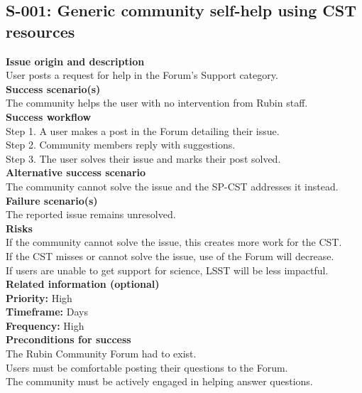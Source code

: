 \subsection{S-001: Generic community self-help using CST resources}

\textbf{Issue origin and description} \\
User posts a request for help in the Forum's Support category. \\

\textbf{Success scenario(s)} \\
The community helps the user with no intervention from Rubin staff. \\

\textbf{Success workflow} \\
Step 1. A user makes a post in the Forum detailing their issue. \\
Step 2. Community members reply with suggestions. \\
Step 3. The user solves their issue and marks their post solved. \\

\textbf{Alternative success scenario} \\
The community cannot solve the issue and the SP-CST addresses it instead. \\

\textbf{Failure scenario(s)} \\
The reported issue remains unresolved. \\

\textbf{Risks} \\
If the community cannot solve the issue, this creates more work for the CST. \\
If the CST misses or cannot solve the issue, use of the Forum will decrease. \\
If users are unable to get support for science, LSST will be less impactful. \\

\textbf{Related information (optional)} \\
\textbf{Priority:} High \\
\textbf{Timeframe:} Days \\
\textbf{Frequency:} High \\

\textbf{Preconditions for success} \\
The Rubin Community Forum had to exist. \\
Users must be comfortable posting their questions to the Forum. \\
The community must be actively engaged in helping answer questions. \\
